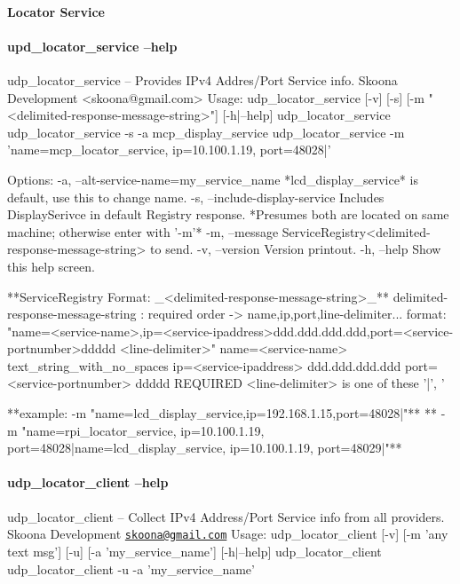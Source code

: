 \paragraph*{Locator Service}



\paragraph*{upd\+\_\+locator\+\_\+service --help}

\begin{DoxyVerb}udp_locator_service -- Provides IPv4 Addres/Port Service info.
          Skoona Development <skoona@gmail.com>
Usage:
  udp_locator_service [-v] [-s] [-m "<delimited-response-message-string>"] [-h|--help]
  udp_locator_service 
  udp_locator_service -s -a mcp_display_service
  udp_locator_service -m 'name=mcp_locator_service, ip=10.100.1.19, port=48028|'

Options:
  -a, --alt-service-name=my_service_name
                 *lcd_display_service* is default, use this to change name.
  -s, --include-display-service  Includes DisplaySerivce in default Registry response.
                *Presumes both are located on same machine; otherwise enter with '-m'*
  -m, --message  ServiceRegistry<delimited-response-message-string> to send.
  -v, --version  Version printout.
  -h, --help     Show this help screen.

  **ServiceRegistry Format:  _<delimited-response-message-string>_**
    delimited-response-message-string : required order -> name,ip,port,line-delimiter...
      format: "name=<service-name>,ip=<service-ipaddress>ddd.ddd.ddd.ddd,port=<service-portnumber>ddddd <line-delimiter>"
        name=<service-name> text_string_with_no_spaces
        ip=<service-ipaddress> ddd.ddd.ddd.ddd
        port=<service-portnumber> ddddd
      REQUIRED   <line-delimiter> is one of these '|', '%

    **example: -m "name=lcd_display_service,ip=192.168.1.15,port=48028|"**
    ** -m "name=rpi_locator_service, ip=10.100.1.19, port=48028|name=lcd_display_service, ip=10.100.1.19, port=48029|"**
\end{DoxyVerb}


\paragraph*{udp\+\_\+locator\+\_\+client --help}

udp\+\_\+locator\+\_\+client -- Collect I\+Pv4 Address/\+Port Service info from all providers. Skoona Development \href{mailto:skoona@gmail.com}{\tt skoona@gmail.\+com} Usage\+: udp\+\_\+locator\+\_\+client \mbox{[}-\/v\mbox{]} \mbox{[}-\/m 'any text msg'\mbox{]} \mbox{[}-\/u\mbox{]} \mbox{[}-\/a 'my\+\_\+service\+\_\+name'\mbox{]} \mbox{[}-\/h$\vert$--help\mbox{]} udp\+\_\+locator\+\_\+client udp\+\_\+locator\+\_\+client -\/u -\/a 'my\+\_\+service\+\_\+name'

